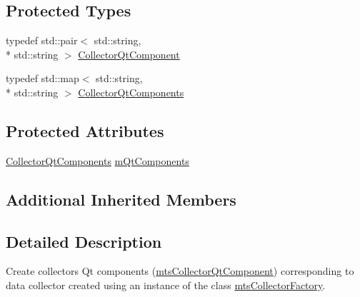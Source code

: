 \subsection*{Protected Types}
\begin{DoxyCompactItemize}
\item 
typedef std\-::pair$<$ std\-::string, \\*
std\-::string $>$ \hyperlink{classmts_collector_qt_factory_a8860ea4a5149d8f748ad9e3e32d6b271}{Collector\-Qt\-Component}
\item 
typedef std\-::map$<$ std\-::string, \\*
std\-::string $>$ \hyperlink{classmts_collector_qt_factory_a328adc18f15a7e2e39af3d30ba436c04}{Collector\-Qt\-Components}
\end{DoxyCompactItemize}
\subsection*{Protected Attributes}
\begin{DoxyCompactItemize}
\item 
\hyperlink{classmts_collector_qt_factory_a328adc18f15a7e2e39af3d30ba436c04}{Collector\-Qt\-Components} \hyperlink{classmts_collector_qt_factory_a09d17a7a0f8afab2ec0171abbf57f931}{m\-Qt\-Components}
\end{DoxyCompactItemize}
\subsection*{Additional Inherited Members}


\subsection{Detailed Description}
Create collectors Qt components (\hyperlink{classmts_collector_qt_component}{mts\-Collector\-Qt\-Component}) corresponding to data collector created using an instance of the class \hyperlink{classmts_collector_factory}{mts\-Collector\-Factory}. 

